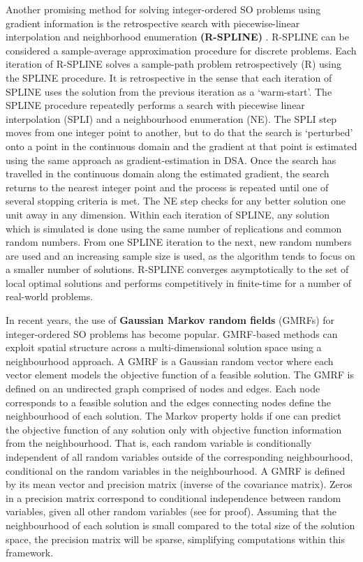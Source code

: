 \documentclass[12pt,a4paper]{article}
\begin{document}
Another promising method for solving integer-ordered SO problems using gradient information is the retrospective search with piecewise-linear interpolation and neighborhood enumeration \textbf{(R-SPLINE)} \citep{wang2013integer}. R-SPLINE can be considered a sample-average approximation procedure for discrete problems. Each iteration of R-SPLINE solves a sample-path problem retrospectively (R) using the SPLINE procedure. It is retrospective in the sense that each iteration of SPLINE uses the solution from the previous iteration as a `warm-start'. The SPLINE procedure repeatedly performs a search with piecewise linear interpolation (SPLI) and a neighbourhood enumeration (NE). The SPLI step moves from one integer point to another, but to do that the search is `perturbed' onto a point in the continuous domain and the gradient at that point is estimated using the same approach as gradient-estimation in DSA. Once the search has travelled in the continuous domain along the estimated gradient, the search returns to the nearest integer point and the process is repeated until one of several stopping criteria is met. The NE step checks for any better solution one unit away in any dimension. Within each iteration of SPLINE, any solution which is simulated is done using the same number of replications and common random numbers. From one SPLINE iteration to the next, new random numbers are used and an increasing sample size is used, as the algorithm tends to focus on a smaller number of solutions. R-SPLINE converges asymptotically to the set of local optimal solutions and performs competitively in finite-time for a number of real-world problems. 

In recent years, the use of \textbf{Gaussian Markov random fields} (GMRFs) \citep{l2019gaussian} for integer-ordered SO problems has become popular. GMRF-based methods can exploit spatial structure across a multi-dimensional solution space using a neighbourhood approach. A GMRF is a Gaussian random vector where each vector element models the objective function of a feasible solution. The GMRF is defined on an undirected graph comprised of nodes and edges. Each node corresponds to a feasible solution and the edges connecting nodes define the neighbourhood of each  solution. The Markov property holds if one can predict the objective function of any solution only with objective function information from the neighbourhood. That is, each random variable is conditionally independent of all random variables outside of the corresponding neighbourhood, conditional on the random variables in the neighbourhood. A GMRF is defined by its mean vector and precision matrix (inverse of the covariance matrix). Zeros in a precision matrix correspond to conditional independence between random variables, given all other random variables (see \cite{rue2005gaussian} for proof). Assuming that the neighbourhood of each solution is small compared to the total size of the solution space, the precision matrix will be sparse, simplifying computations within this framework. 
\end{document}

